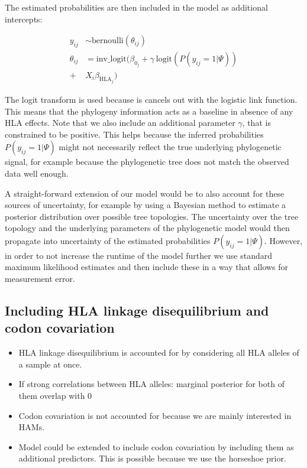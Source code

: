 \documentclass[fleqn,11pt]{SelfArx} %
\begin{document}
The estimated probabilities are then included in the model as additional intercepts:

\begin{equation}
\begin{aligned}
  y_{ij} & \sim \text{bernoulli}(\theta_{ij}) \\
  \theta_{ij} & = \text{inv\_logit}(\beta_{0_{j}} + \gamma~\text{logit}(P(y_{ij}=1|\Psi)) \\ + & X_{i}\beta_{\text{HLA}_{j}})
\end{aligned}
\end{equation}

The logit transform is used because is cancels out with the logistic link function. This means that the phylogeny information acts as a baseline in absence of any HLA effects. Note that we also include an additional parameter \(\gamma\), that is constrained to be positive. This helps because the inferred probabilities \(P(y_{ij}=1|\Psi)\) might not necessarily reflect the true underlying phylogenetic signal, for example because the phylogenetic tree does not match the observed data well enough.

A straight-forward extension of our model would be to also account for these sources of uncertainty, for example by using a Bayesian method to estimate a posterior distribution over possible tree topologies. The uncertainty over the tree topology and the underlying parameters of the phylogenetic model would then propagate into uncertainty of the estimated probabilities \(P(y_{ij}=1|\Psi)\). However, in order to not increase the runtime of the model further we  use standard maximum likelihood estimates and then include these in a way that allows for measurement error.

\subsection*{Including HLA linkage disequilibrium and codon covariation}

\begin{itemize}
  \item HLA linkage disequilibrium is accounted for by considering all HLA alleles of a sample at once.
  \item If strong correlations between HLA alleles: marginal posterior for both of them overlap with 0
  \item Codon covariation is not accounted for because we are mainly interested in HAMs.
  \item Model could be extended to include codon covariation by including them as additional predictors. This is possible because we use the horseshoe prior.
\end{itemize}
\end{document}
